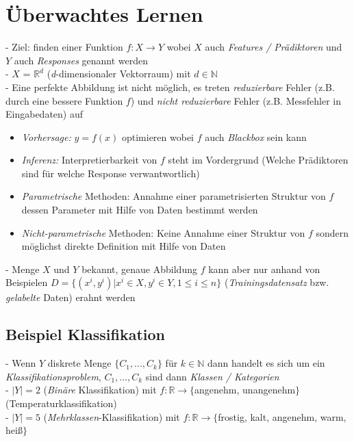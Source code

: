 \documentclass{report}
\begin{document}
  \section{Überwachtes Lernen}	
  - Ziel: finden einer Funktion $f: X \rightarrow Y$ wobei $X$ auch \textit{Features / Prädiktoren} und $Y$ auch \textit{Responses} genannt werden\\	
  - $X$ = $\mathbb{R}^d$ (\textit{d}-dimensionaler Vektorraum) mit $d\in \mathbb{N}$\\	
  - Eine perfekte Abbildung ist nicht möglich, es treten \textit{reduzierbare} Fehler (z.B. durch eine bessere Funktion $f$) und \textit{nicht reduzierbare} Fehler (z.B. Messfehler in Eingabedaten) auf\\	
  \vspace*{-1.5em}	
  \begin{itemize}	
    \item \textit{Vorhersage:} $y = f(x)$ optimieren wobei $f$ auch \textit{Blackbox} sein kann	
    \item \textit{Inferenz:} Interpretierbarkeit von $f$ steht im Vordergrund (Welche Prädiktoren sind für welche Response verwantwortlich)	
    \item \textit{Parametrische} Methoden: Annahme einer parametrisierten Struktur von $f$ dessen Parameter mit Hilfe von Daten bestimmt werden	
    \item \textit{Nicht-parametrische} Methoden: Keine Annahme einer Struktur von $f$ sondern möglichst direkte Definition mit Hilfe von Daten	
  \end{itemize}	
  - Menge $X$ und $Y$ bekannt, genaue Abbildung $f$ kann aber nur anhand von Beispielen $D = \{(x^i, y^i) | x^i \in X, y^i \in Y, 1 \leq i \leq n\}$ (\textit{Trainingsdatensatz} bzw. \textit{gelabelte} Daten) erahnt werden\\	
  
  \subsection{Beispiel Klassifikation}	
  - Wenn $Y$ diskrete Menge $\{C_1, ..., C_k\}$ für $k \in \mathbb{N}$ dann handelt es sich um ein \textit{Klassifikationsproblem}, $C_1, ..., C_k$ sind dann \textit{Klassen / Kategorien}\\	
  - $|Y| = 2$ (\textit{Binäre} Klassifikation) mit $f : \mathbb{R} \rightarrow \{$angenehm, unangenehm$\}$ (Temperaturklassifikation)\\	
  - $|Y| = 5$ (\textit{Mehrklassen}-Klassifikation) mit $f : \mathbb{R} \rightarrow \{$frostig, kalt, angenehm, warm, heiß$\}$	
  
\end{document}
